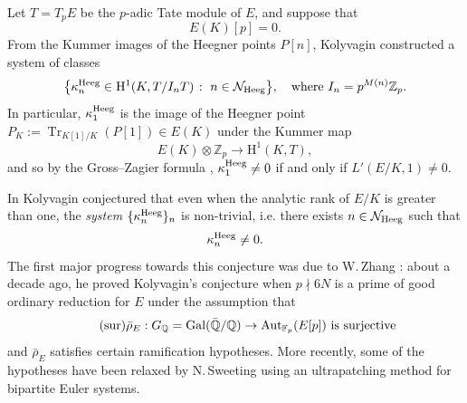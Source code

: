 \documentclass[10pt,reqno]{amsart}
\numberwithin{equation}{section}
\theoremstyle{plain}
\theoremstyle{definition}
\theoremstyle{definition}
\theoremstyle{plain}
\theoremstyle{plain}
\theoremstyle{plain}
\theoremstyle{plain}
\theoremstyle{plain}
\theoremstyle{plain}
\newcommand{\Z}{\mathbb{Z}}
\newcommand{\Q}{\mathbb{Q}}
\newcommand{\rH}{\mathrm{H}}
\begin{document}
Let $T=T_pE$ be the $p$-adic Tate module of $E$, and suppose that
\begin{equation}\label{eq:intro-tor}
E(K)[p]=0.\tag{tor}
\end{equation}
From the Kummer images of the Heegner points $P[n]$, Kolyvagin constructed a system of classes 
\[
\bigl\{\kappa_{n}^{\rm Heeg}\in \rH^1(K,T/I_nT)\;\colon\;n\in \mathcal{N}_{\rm Heeg}\bigr\},\quad\textrm{where $I_n=p^{M(n)}\Z_p$.}
\] 
In particular, $\kappa_{1}^{\rm Heeg}$ is the image of the Heegner point $P_K:=\operatorname{Tr}_{K[1]/K}(P[1])\in E(K)$ under the Kummer map
\[
E(K)\otimes\Z_p\rightarrow\rH^1(K,T), 
\] 
and so by the Gross--Zagier formula \cite{grosszagier}, $\kappa_1^{\rm Heeg}\neq 0$ if and only if $L'(E/K,1)\neq 0$. 

In \cite{kolystructure} Kolyvagin  conjectured
that even when the analytic rank of $E/K$ is greater than one, 
the \emph{system} $\{\kappa_{n}^{\rm Heeg}\}_{n}$ is non-trivial,  i.e. there exists $n\in \mathcal{N}_{\rm Heeg}$ such that $$\kappa_{n}^{\rm Heeg}\neq 0.$$ 
The first major progress towards this conjecture was due to W.\,Zhang \cite{zhang_ind}: about a decade ago, he proved Kolyvagin's conjecture 
when $p\nmid 6N$ is a prime of good ordinary reduction for $E$ %
under the assumption that
\begin{equation}\label{eq:irred}
\tag{sur}
\textrm{$\bar{\rho}_E: G_{\Q}=\operatorname{Gal}(\bar{\Q}/\Q)\to{\rm Aut}_{\mathbb{F}_p}(E[p])$ is surjective}
\end{equation}
and $\bar{\rho}_E$ satisfies certain ramification hypotheses. More recently, 
some of the hypotheses have been 
relaxed by N.\,Sweeting  \cite{sweeting} using an ultrapatching method for bipartite Euler systems. 
\end{document}
